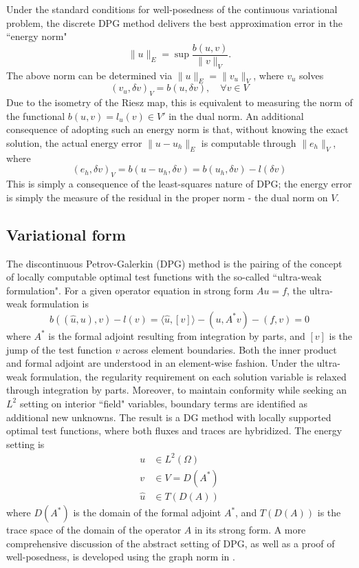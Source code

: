 \documentclass[11pt,onecolumn]{scrartcl}
\begin{document}
Under the standard conditions for well-posedness of the continuous variational problem, the discrete DPG method delivers the best approximation error in the ``energy norm" 
\[
\|u\|_E = \sup \frac{b(u,v)}{\|v\|_V}.
\]
The above norm can be determined via $\|u\|_E = \|v_u\|_V$, where $v_u$ solves
\[
(v_u,\delta v)_V = b(u,\delta v), \quad \forall v \in V
\]
Due to the isometry of the Riesz map, this is equivalent to measuring the norm of the functional $b(u,v) = l_u(v)\in V'$ in the dual norm. An additional consequence of adopting such an energy norm is that, without knowing the exact solution, the actual energy error $\|u-u_h\|_E$ is computable through $\|e_h\|_V$, where
\[
\left(e_h,\delta v\right)_V = b(u-u_h,\delta v) = b(u_h,\delta v)-l(\delta v)
\]
This is simply a consequence of the least-squares nature of DPG; the energy error is simply the measure of the residual in the proper norm - the dual norm on $V$.  

\subsection{Variational form}

The discontinuous Petrov-Galerkin (DPG) method is the pairing of the concept of locally computable optimal test functions with the so-called ``ultra-weak formulation". For a given operator equation in strong form $Au = f$, the ultra-weak formulation is
\[
b\left(\left(\widehat{u},u\right),v\right) - l(v) = \langle \widehat{u}, [v] \rangle - (u,A^*v) - (f,v) = 0
\]
where $A^*$ is the formal adjoint resulting from integration by parts,
and $[v]$ is the jump of the test function $v$ across element
boundaries.  Both the inner product and formal adjoint are understood
in an element-wise fashion. Under the ultra-weak formulation, the
regularity requirement on each solution variable is relaxed through
integration by parts.  Moreover, to maintain conformity while seeking
an $L^2$ setting on interior ``field" variables, boundary terms are
identified as additional new unknowns.  The result is a DG
method with locally supported optimal test functions, where both fluxes and traces are hybridized.  The energy setting is
\begin{align*}
u&\in L^2(\Omega)\\
v&\in V=D(A^*) \\
\widehat{u}&\in T(D(A))
\end{align*}
where $D(A^*)$ is the domain of the formal adjoint $A^*$, and $T(D(A))$ is the trace space of the domain of the operator $A$ in its strong form. A more comprehensive discussion of the abstract setting of DPG, as well as a proof of well-posedness, is developed using the graph norm in \cite{DPGFriedrichs}.
\end{document}

